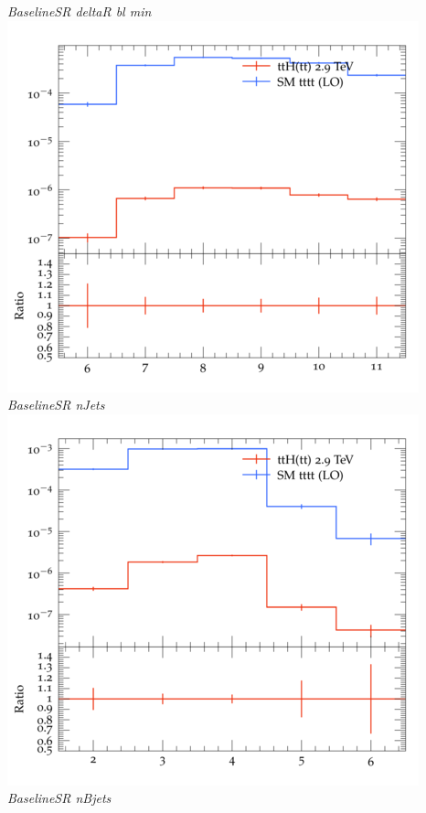 \documentclass{beamer}
\begin{document}
\begin{frame}
\begin{columns}
\textit{\small BaselineSR deltaR bl min}
\includegraphics[width=\textwidth]{../plots/ttH_2900/tttt_ttH_1LOS/BaselineSR_nJets.png}\\
\textit{\small BaselineSR nJets}
\includegraphics[width=\textwidth]{../plots/ttH_2900/tttt_ttH_1LOS/BaselineSR_nBjets.png}\\
\textit{\small BaselineSR nBjets}
\end{columns}
\end{frame}
\end{document}
